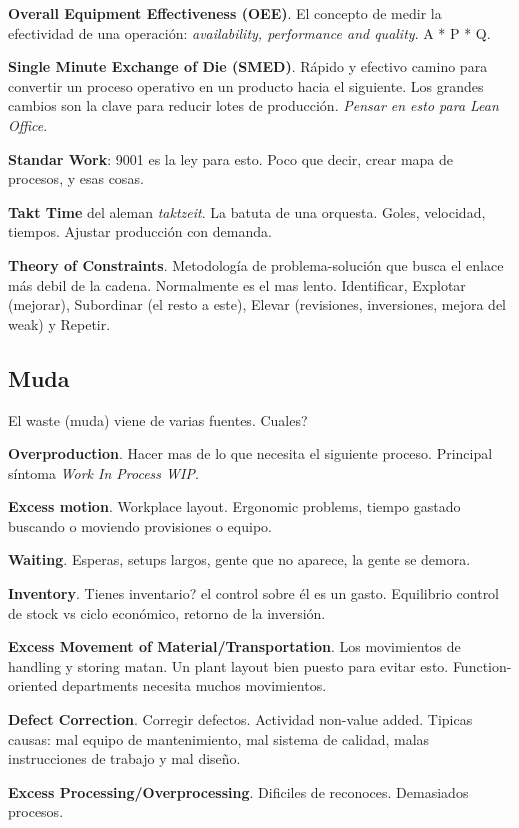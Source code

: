 \documentclass[]{article}
\begin{document}
\textbf{Overall Equipment Effectiveness (OEE)}. El concepto de medir la efectividad de una operación: \textit{availability, performance and quality}. A * P * Q. 

\textbf{Single Minute Exchange of Die (SMED)}. Rápido y efectivo camino para convertir un proceso operativo en un producto hacia el siguiente. Los grandes cambios son la clave para reducir lotes de producción. \textit{Pensar en esto para Lean Office}.

\textbf{Standar Work}: 9001 es la ley para esto. Poco que decir, crear mapa de procesos, y esas cosas.

\textbf{Takt Time} del aleman \textit{taktzeit}. La batuta de una orquesta. Goles, velocidad, tiempos. Ajustar producción con demanda.

\textbf{Theory of Constraints}. Metodología de problema-solución que busca el enlace más debil de la cadena. Normalmente es el mas lento. Identificar, Explotar (mejorar), Subordinar (el resto a este), Elevar (revisiones, inversiones, mejora del weak) y Repetir.

\subsection{Muda}

El waste (muda) viene de varias fuentes. Cuales?

\textbf{Overproduction}. Hacer mas de lo que necesita el siguiente proceso. Principal síntoma \textit{Work In Process WIP}.

\textbf{Excess motion}. Workplace layout. Ergonomic problems, tiempo gastado buscando o moviendo provisiones o equipo.

\textbf{Waiting}. Esperas, setups largos, gente que no aparece, la gente se demora. 

\textbf{Inventory}. Tienes inventario? el control sobre él es un gasto. Equilibrio control de stock vs ciclo económico, retorno de la inversión.

\textbf{Excess Movement of Material/Transportation}. Los movimientos de handling y storing matan. Un plant layout bien puesto para evitar esto. Function-oriented departments necesita muchos movimientos.

\textbf{Defect Correction}. Corregir defectos. Actividad non-value added. Tipicas causas: mal equipo de mantenimiento, mal sistema de calidad, malas instrucciones de trabajo y mal diseño. 

\textbf{Excess Processing/Overprocessing}. Dificiles de reconoces. Demasiados procesos. 
\end{document}
